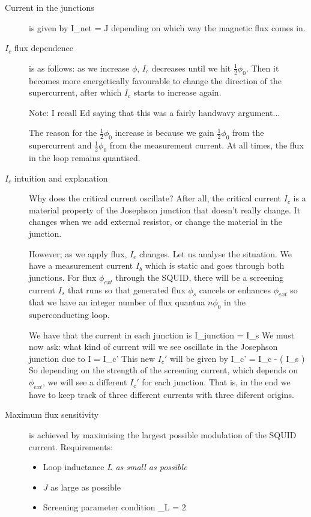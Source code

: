 \begin{description}
\item[Current in the junctions] is given by 
\beq
I_{net} =  \pm J
\eeq
depending on which way the magnetic flux comes in. 

\item[$I_c$ flux dependence] is as follows:  as we increase $\phi$, $I_c$ decreases until we hit $\frac{1}{2} \phi_0$. Then it becomes more energetically favourable to change the direction of the supercurrent, after which $I_c$ starts to increase again. 

Note: I recall Ed saying that this was a fairly handwavy argument... 

The reason for the $\frac{1}{2} \phi_0$ increase is because we gain $\frac{1}{2} \phi_0$ from the supercurrent and $\frac{1}{2} \phi_0$ from the measurement current. At all times, the flux in the loop remains quantised. 

\item[$I_c$ intuition and explanation] Why does the critical current oscillate? After all, the critical current $I_c$ is a material property of the Josephson junction that doesn't really change. It changes when we add external resistor, or change the material in the junction. 

However; as we apply flux, $I_c$ changes. Let us analyse the situation. We have a measurement current $I_b$ which is static and goes through both junctions. For flux $\phi_{ext}$ through the SQUID, there will be a screening current $I_s$ that runs so that generated flux $\phi_s$ cancels or enhances $\phi_{ext}$ so that we have an integer number of flux quantua $n \phi_0$ in the superconducting loop. 

We have that the current in each junction is
\beq
I_{junction} =  \pm I_s
\eeq
We must now ask: what kind of current will we see oscillate in the Josephson junction due to 
\beq
I = I_c' \sin{\delta}
\eeq
This new $I_c'$ will be given by 
\beq
I_c' = I_c - \left(  \pm I_s \right)
\eeq
So depending on the strength of the screening current, which depends on $\phi_{ext}$, we will see a different $I_c'$ for each junction. That is, in the end we have to keep track of three different currents with three diferent origins. 

\item[Maximum flux sensitivity] is achieved by maximising the largest possible modulation of the SQUID current. Requirements:
\begin{itemize}
\item Loop inductance $L$ \emph{as small as possible}
\item $J$ as large as possible
\item Screening parameter condition
\beq
\beta_L  = 2  
\eeq
\end{itemize}



\end{description}

